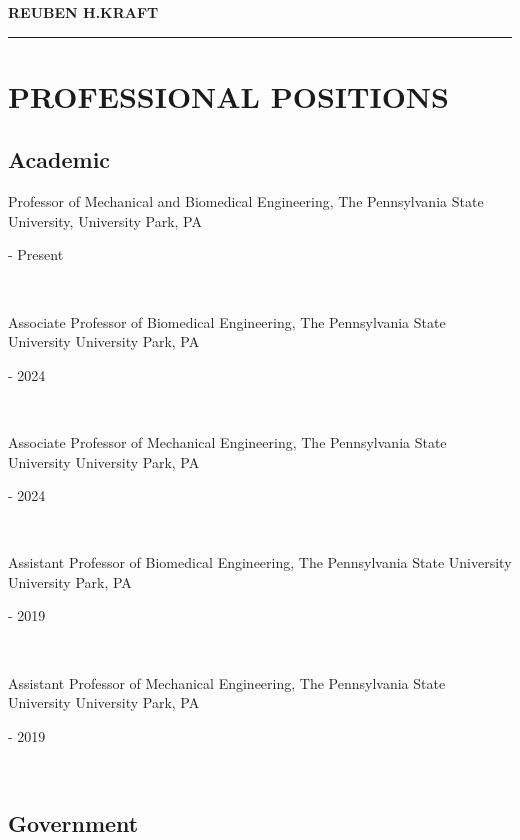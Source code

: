 \documentclass[a4paper,10pt]{article}
\author{}
\date{}
\begin{document}
    \begin{center}
    \LARGE \textbf{\textsc{REUBEN H.KRAFT}} \\
    \rule{\linewidth}{2pt}
    \end{center}
    \normalsize %
    


    \section*{PROFESSIONAL POSITIONS}
    
    \subsection*{Academic}
    
            \noindent \parbox[t]{0.8\linewidth}{\raggedright Professor of Mechanical and Biomedical Engineering, The Pennsylvania State University, University Park, PA} \hfill \parbox[t]{0.2\linewidth}{ - Present} \\
            
            \noindent \parbox[t]{0.8\linewidth}{\raggedright Associate Professor of Biomedical Engineering, The Pennsylvania State University
University Park, PA} \hfill \parbox[t]{0.2\linewidth}{ - 2024} \\
            
            \noindent \parbox[t]{0.8\linewidth}{\raggedright Associate Professor of Mechanical Engineering, The Pennsylvania State University
University Park, PA} \hfill \parbox[t]{0.2\linewidth}{ - 2024} \\
            
            \noindent \parbox[t]{0.8\linewidth}{\raggedright Assistant Professor of Biomedical Engineering, The Pennsylvania State University
University Park, PA} \hfill \parbox[t]{0.2\linewidth}{ - 2019} \\
            
            \noindent \parbox[t]{0.8\linewidth}{\raggedright Assistant Professor of Mechanical Engineering, The Pennsylvania State University
University Park, PA} \hfill \parbox[t]{0.2\linewidth}{ - 2019} \\
            
    \subsection*{Government}
    
\end{document}
